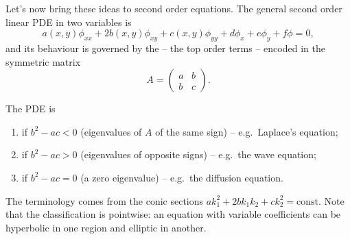 \documentclass[a4paper]{scrartcl}
\begin{document}
Let's now bring these ideas to second order equations. The general second order linear PDE in two variables is
$$
a(x,y) \phi_{xx} + 2b(x, y) \phi_{xy} + c(x, y)\phi_{yy} + d \phi_x + e \phi_y + f \phi = 0,
$$
and its behaviour is governed by the  -- the top order terms -- encoded in the symmetric matrix
$$
A = \begin{pmatrix}
    a & b \\ b & c
\end{pmatrix}.
$$

\begin{definition}[Classification]
    The PDE is
    \begin{enumerate}[label=(\roman*)]
        \item {} if $b^2 - ac < 0$ (eigenvalues of $A$ of the same sign) -- e.g.\ Laplace's equation;
        \item {} if $b^2 - ac > 0$ (eigenvalues of opposite signs) -- e.g.\ the wave equation;
        \item {} if $b^2 - ac = 0$ (a zero eigenvalue) -- e.g.\ the diffusion equation.
    \end{enumerate}
\end{definition}

The terminology comes from the conic sections $a k_1^2 + 2b k_1 k_2 + c k_2^2 = \text{const}$. Note that the classification is pointwise: an equation with variable coefficients can be hyperbolic in one region and elliptic in another.
\end{document}
